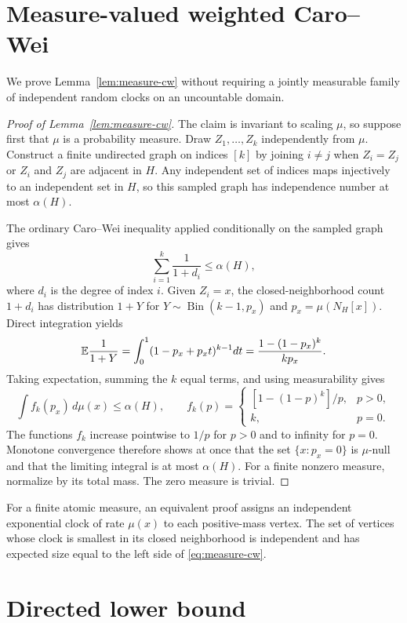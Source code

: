 \section{Measure-valued weighted Caro--Wei}\label{app:upper}

We prove Lemma~\ref{lem:measure-cw} without requiring a jointly measurable family of independent
random clocks on an uncountable domain.

\begin{proof}[Proof of Lemma~\ref{lem:measure-cw}]
The claim is invariant to scaling $\mu$, so suppose first that $\mu$ is a probability measure.
Draw $Z_1,\ldots,Z_k$ independently from $\mu$. Construct a finite undirected graph on indices
$[k]$ by joining $i\ne j$ when $Z_i=Z_j$ or $Z_i$ and $Z_j$ are adjacent in $H$. Any independent
set of indices maps injectively to an independent set in $H$, so this sampled graph has independence
number at most $\alpha(H)$.

The ordinary Caro--Wei inequality applied conditionally on the sampled graph gives
\[
 \sum_{i=1}^k\frac{1}{1+d_i}\le\alpha(H),
\]
where $d_i$ is the degree of index $i$. Given $Z_i=x$, the closed-neighborhood count
$1+d_i$ has distribution $1+Y$ for
$Y\sim\operatorname{Bin}(k-1,p_x)$ and $p_x=\mu(N_H[x])$. Direct integration yields
\[
 \mathbb E\frac{1}{1+Y}
 =\int_0^1(1-p_x+p_xt)^{k-1}dt
 =\frac{1-(1-p_x)^k}{kp_x}.
\]
Taking expectation, summing the $k$ equal terms, and using measurability gives
\[
 \int f_k(p_x)\,d\mu(x)\le\alpha(H),\qquad
 f_k(p)=\begin{cases}[1-(1-p)^k]/p,&p>0,\\ k,&p=0.\end{cases}
\]
The functions $f_k$ increase pointwise to $1/p$ for $p>0$ and to infinity for $p=0$. Monotone
convergence therefore shows at once that the set $\{x:p_x=0\}$ is $\mu$-null and that the limiting
integral is at most $\alpha(H)$. For a finite nonzero measure, normalize by its total mass. The zero
measure is trivial.
\end{proof}

\begin{remark}
For a finite atomic measure, an equivalent proof assigns an independent exponential clock of rate
$\mu(x)$ to each positive-mass vertex. The set of vertices whose clock is smallest in its closed
neighborhood is independent and has expected size equal to the left side of
\eqref{eq:measure-cw}.
\end{remark}

\section{Directed lower bound}\label{app:directed}

